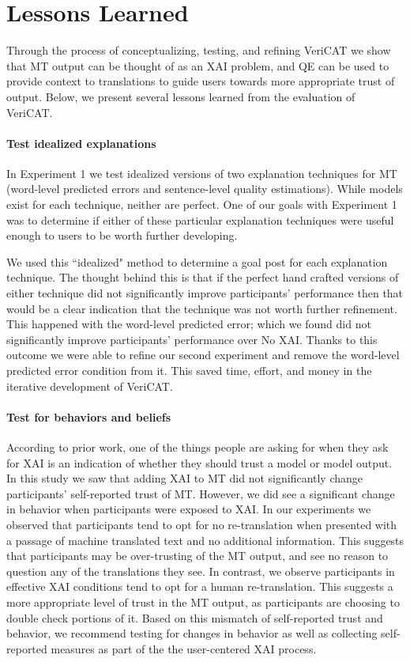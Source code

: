 \section{Lessons Learned}

Through the process of conceptualizing, testing, and refining VeriCAT we show that MT output can be thought of as an XAI problem, and QE can be used to provide context to translations to guide users towards more appropriate trust of output. Below, we present several lessons learned from the evaluation of VeriCAT.     

\paragraph{\textbf{Test idealized explanations}} In Experiment 1 we test idealized versions of two explanation techniques for MT (word-level predicted errors and sentence-level quality estimations). While models exist for each technique, neither are perfect. One of our goals with Experiment 1 was to determine if either of these particular explanation techniques were useful enough to users to be worth further developing. 

We used this ``idealized" method to determine a goal post for each explanation technique. The thought behind this is that if the perfect hand crafted versions of either technique did not significantly improve participants' performance then that would be a clear indication that the technique was not worth further refinement. This happened with the word-level predicted error; which we found did not significantly improve participants' performance over No XAI. Thanks to this outcome we were able to refine our second experiment and remove the word-level predicted error condition from it. This saved time, effort, and money in the iterative development of VeriCAT.   

\paragraph{\textbf{Test for behaviors and beliefs}} According to prior work, one of the things people are asking for when they ask for XAI is an indication of whether they should trust a model or model output\cite{brennen2020What}. In this study we saw that adding XAI to MT did not significantly change participants' self-reported trust of MT. However, we did see a significant change in behavior when participants were exposed to XAI. In our experiments we observed that participants tend to opt for no re-translation when presented with a passage of machine translated text and no additional information. This suggests that participants may be over-trusting of the MT output, and see no reason to question any of the translations they see. In contrast, we observe participants in effective XAI conditions tend to opt for a human re-translation. This suggests a more appropriate level of trust in the MT output, as participants are choosing to double check portions of it. Based on this mismatch of self-reported trust and behavior, we recommend testing for changes in behavior as well as collecting self-reported measures as part of the the user-centered XAI process.    

